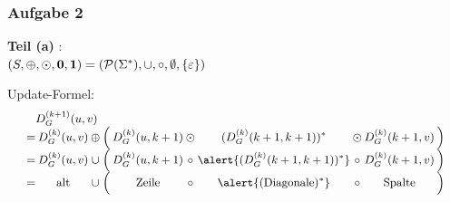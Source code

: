 \documentclass{beamer}
\begin{document}


\begin{frame} \frametitle{Aufgabe 2}
	\begin{minipage}{\dimexpr0.5\linewidth-\fboxrule-\fboxsep}
		\begin{center}
		\end{center}
	\end{minipage} 
	\pause
	\begin{minipage}{\dimexpr0.5\linewidth-\fboxrule-\fboxsep}
		\centering
		\textbf{Teil (a)} : \\
		$(S, \oplus, \odot, \mathbf{0}, \mathbf{1}) = (\mathcal{P}(\Sigma^\ast), \cup, \circ, \emptyset, \left\{ \varepsilon \right\})$
	\end{minipage}

	\hspace{1em} \pause
	
	Update-Formel: 
	\begin{equation*}
	\small
	\setlength{\arraycolsep}{1pt}
		\begin{array}{rccrcccccr}
			\mathrlap{D_G^{(k+1)}(u,v)}\\
			=& D_G^{(k)}(u,v) &\oplus& \Big( & D_G^{(k)}(u,k+1) &\odot& (D_G^{(k)}(k+1,k+1))^\ast &\odot& D_G^{(k)}(k+1,v) & \Big) \\
			=& D_G^{(k)}(u,v) &\cup& \Big( & D_G^{(k)}(u,k+1) &\circ& \alert{(D_G^{(k)}(k+1,k+1))^\ast} &\circ& D_G^{(k)}(k+1,v) & \Big) \\
			=& \text{alt} &\cup& \Big(& \text{Zeile} &\circ& \alert{(\text{Diagonale})^\ast} &\circ& \text{Spalte} & \Big)
		\end{array}
	\end{equation*}
\end{frame}
\end{document}
